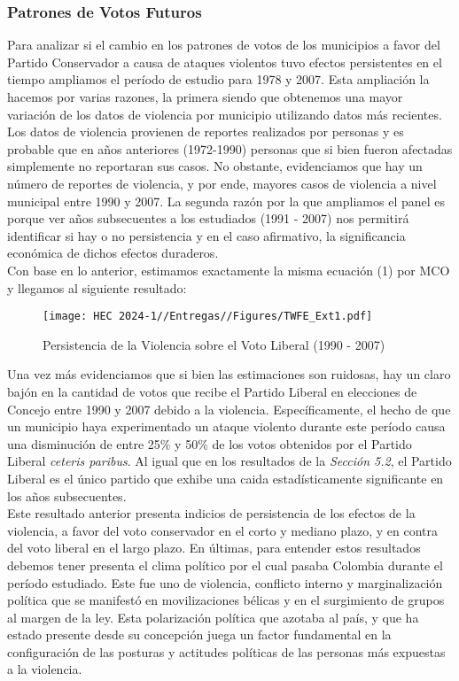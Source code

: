 \documentclass[a4paper]{article}
\begin{document}
\subsubsection{Patrones de Votos Futuros}
Para analizar si el cambio en los patrones de votos de los municipios a favor del Partido Conservador a causa de ataques violentos tuvo efectos persistentes en el tiempo ampliamos el período de estudio para 1978 y 2007. Esta ampliación la hacemos por varias razones, la primera siendo que obtenemos una mayor variación de los datos de violencia por municipio utilizando datos más recientes. Los datos de violencia provienen de reportes realizados por personas y es probable que en años anteriores (1972-1990) personas que si bien fueron afectadas simplemente no reportaran sus casos. No obstante, evidenciamos que hay un número de reportes de violencia, y por ende, mayores casos de violencia a nivel municipal entre 1990 y 2007. La segunda razón por la que ampliamos el panel es porque ver años subsecuentes a los estudiados (1991 - 2007) nos permitirá identificar si hay o no persistencia y en el caso afirmativo, la significancia económica de dichos efectos duraderos. \\

Con base en lo anterior, estimamos exactamente la misma ecuación (1) por MCO y llegamos al siguiente resultado:

\begin{figure}[H]
    \centering
    \caption{Persistencia de la Violencia sobre el Voto Liberal (1990 - 2007)}
    \texttt{[image: HEC 2024-1//Entregas//Figures/TWFE\_Ext1.pdf]}
    \label{fig:persistence1}
\end{figure}

Una vez más evidenciamos que si bien las estimaciones son ruidosas, hay un claro bajón en la cantidad de votos que recibe el Partido Liberal en elecciones de Concejo entre 1990 y 2007 debido a la violencia. Específicamente, el hecho de que un municipio haya experimentado un ataque violento durante este período causa una disminución de entre 25\% y 50\% de los votos obtenidos por el Partido Liberal \textit{ceteris paribus}. Al igual que en los resultados de la \textit{Sección 5.2}, el Partido Liberal es el único partido que exhibe una caida estadísticamente significante en los años subsecuentes. \\

Este resultado anterior presenta indicios de persistencia de los efectos de la violencia, a favor del voto conservador en el corto y mediano plazo, y en contra del voto liberal en el largo plazo. En últimas, para entender estos resultados debemos tener presenta el clima político por el cual pasaba Colombia durante el período estudiado. Este fue uno de violencia, conflicto interno y marginalización política que se manifestó en movilizaciones bélicas y en el surgimiento de grupos al margen de la ley. Esta polarización política que azotaba al país, y que ha estado presente desde su concepción juega un factor fundamental en la configuración de las posturas y actitudes políticas de las personas más expuestas a la violencia.
\end{document}
